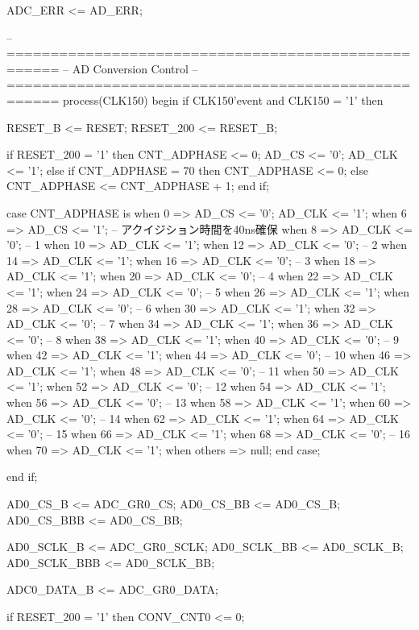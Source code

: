 \begin{mylisting}[language=VHDL,caption=AD変換モジュール,label=appF_ADC_module_VHDL]
	ADC_ERR	<= AD_ERR;

	-- ====================================================
	-- AD Conversion Control
	-- ====================================================
	process(CLK150)
	begin
		if CLK150'event and CLK150 = '1' then
			
			RESET_B		<= RESET;
			RESET_200	<= RESET_B;
			
			if RESET_200 = '1' then
				CNT_ADPHASE		<= 0;
				AD_CS			<= '0';
				AD_CLK			<= '1';
			else
				if CNT_ADPHASE = 70 then
					CNT_ADPHASE	<= 0;
				else
					CNT_ADPHASE	<= CNT_ADPHASE + 1;
				end if;
				
				case CNT_ADPHASE is
					when 0 => 
										AD_CS		<= '0';
										AD_CLK		<= '1';
					when 6 => 			AD_CS		<= '1';				-- アクイジション時間を40ns確保
					when 8 => 			AD_CLK		<= '0';				-- 1
					when 10 => 			AD_CLK		<= '1';
					when 12 => 			AD_CLK		<= '0';				-- 2
					when 14 => 			AD_CLK		<= '1';
					when 16 => 			AD_CLK		<= '0';				-- 3
					when 18 => 			AD_CLK		<= '1';
					when 20 => 			AD_CLK		<= '0';				-- 4
					when 22 => 			AD_CLK		<= '1';
					when 24 => 			AD_CLK		<= '0';				-- 5
					when 26 => 			AD_CLK		<= '1';
					when 28 => 			AD_CLK		<= '0';				-- 6
					when 30 => 			AD_CLK		<= '1';
					when 32 => 			AD_CLK		<= '0';				-- 7
					when 34 => 			AD_CLK		<= '1';
					when 36 => 			AD_CLK		<= '0';				-- 8
					when 38 => 			AD_CLK		<= '1';
					when 40 => 			AD_CLK		<= '0';				-- 9
					when 42 => 			AD_CLK		<= '1';
					when 44 => 			AD_CLK		<= '0';				-- 10
					when 46 => 			AD_CLK		<= '1';
					when 48 => 			AD_CLK		<= '0';				-- 11
					when 50 => 			AD_CLK		<= '1';
					when 52 => 			AD_CLK		<= '0';				-- 12
					when 54 => 			AD_CLK		<= '1';
					when 56 => 			AD_CLK		<= '0';				-- 13
					when 58 => 			AD_CLK		<= '1';
					when 60 => 			AD_CLK		<= '0';				-- 14
					when 62 => 			AD_CLK		<= '1';
					when 64 => 			AD_CLK		<= '0';				-- 15
					when 66 => 			AD_CLK		<= '1';
					when 68 => 			AD_CLK		<= '0';				-- 16
					when 70 => 			AD_CLK		<= '1';
					when others  => null;
				end case;
				
			end if;
			
			AD0_CS_B		<= ADC_GR0_CS;
			AD0_CS_BB		<= AD0_CS_B;
			AD0_CS_BBB		<= AD0_CS_BB;
			
			AD0_SCLK_B		<= ADC_GR0_SCLK;
			AD0_SCLK_BB		<= AD0_SCLK_B;
			AD0_SCLK_BBB	<= AD0_SCLK_BB;
			
			ADC0_DATA_B		<= ADC_GR0_DATA;
			
			if RESET_200 = '1' then
				CONV_CNT0	<= 0;
				

\end{mylisting}
